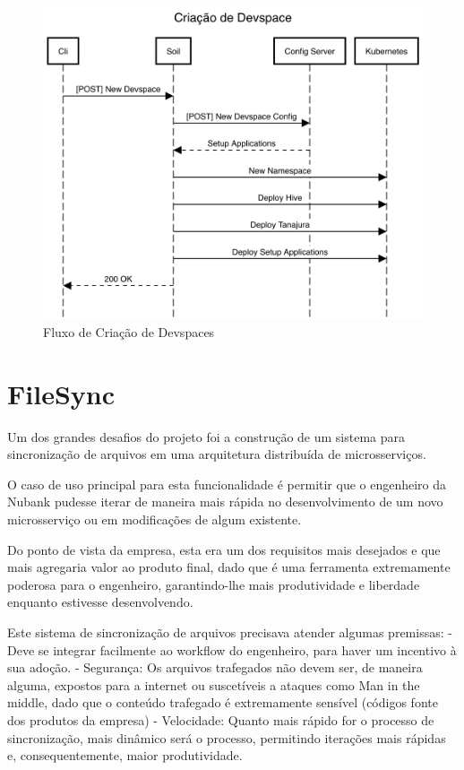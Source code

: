     	\begin{figure}[htbp]
			\caption{\label{fig_create_devspace}Fluxo de Criação de Devspaces}
			\begin{center}
			\includegraphics[scale=0.40]{pictures/create-devspace.png}
			\end{center}
		\end{figure}

	\section{FileSync}

	Um dos grandes desafios do projeto foi a construção de um sistema para sincronização de arquivos em uma arquitetura distribuída de microsserviços.
	
	O caso de uso principal para esta funcionalidade é permitir que o engenheiro da Nubank pudesse iterar de maneira mais rápida no desenvolvimento de um novo microsserviço ou em modificações de algum existente.
	
	Do ponto de vista da empresa, esta era um dos requisitos mais desejados e que mais agregaria valor ao produto final, dado que é uma ferramenta extremamente poderosa para o engenheiro, garantindo-lhe mais produtividade e liberdade enquanto estivesse desenvolvendo.
	
	Este sistema de sincronização de arquivos precisava atender algumas premissas:
	- Deve se integrar facilmente ao workflow do engenheiro, para haver um incentivo à sua adoção.
	- Segurança: Os arquivos trafegados não devem ser, de maneira alguma, expostos para a internet ou suscetíveis a ataques como Man in the middle, dado que o conteúdo trafegado é extremamente sensível (códigos fonte dos produtos da empresa)
	- Velocidade: Quanto mais rápido for o processo de sincronização, mais dinâmico será o processo, permitindo iterações mais rápidas e, consequentemente, maior produtividade.

